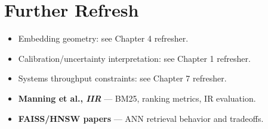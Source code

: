 \section*{Further Refresh}
\begin{itemize}[leftmargin=1.5em]
  \item Embedding geometry: see Chapter 4 refresher.
  \item Calibration/uncertainty interpretation: see Chapter 1 refresher.
  \item Systems throughput constraints: see Chapter 7 refresher.
  \item \textbf{Manning et al., \emph{IIR}} --- BM25, ranking metrics, IR evaluation.
  \item \textbf{FAISS/HNSW papers} --- ANN retrieval behavior and tradeoffs.
\end{itemize}
